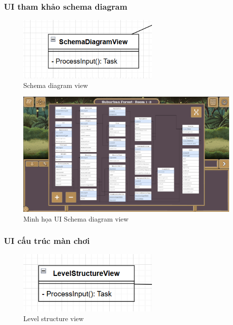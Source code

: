 \subsubsection{UI tham khảo schema diagram}
\begin{figure}[H]
	\centering
	\includegraphics[width=7cm]{Images/SchemaDiagramView.png}
	\vspace{0.5cm}
	\caption{Schema diagram view}
\end{figure}

\begin{figure}[H]
	\centering
	\includegraphics[width=13cm]{Images/SchemaDiagramUi.png}
	\vspace{0.5cm}
	\caption{Minh họa UI Schema diagram view}
\end{figure}

\subsubsection{UI cấu trúc màn chơi}
\begin{figure}[H]
	\centering
	\includegraphics[width=7cm]{Images/LevelStructureView.png}
	\vspace{0.5cm}
	\caption{Level structure view}
\end{figure}

